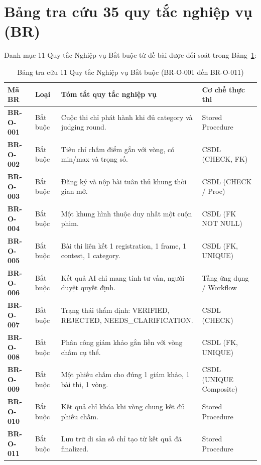 \section{Bảng tra cứu 35 quy tắc nghiệp vụ (BR)}
\label{a:br_catalog}

Danh mục 11 Quy tắc Nghiệp vụ Bắt buộc từ đề bài được đối soát trong Bảng~\ref{tab:a_br_mandatory}:

\begin{table}[!ht]
\centering
\caption{Bảng tra cứu 11 Quy tắc Nghiệp vụ Bắt buộc (BR-O-001 đến BR-O-011)}
\label{tab:a_br_mandatory}
\scriptsize
\begin{tabularx}{\textwidth}{p{1.8cm}p{1.6cm}>{\raggedright\arraybackslash}Xp{3.4cm}}
\toprule
\textbf{Mã BR} & \textbf{Loại} & \textbf{Tóm tắt quy tắc nghiệp vụ} & \textbf{Cơ chế thực thi} \\
\midrule
\textbf{BR-O-001} & Bắt buộc & Cuộc thi chỉ phát hành khi đủ category và judging round. & Stored Procedure \\
\textbf{BR-O-002} & Bắt buộc & Tiêu chí chấm điểm gắn với vòng, có min/max và trọng số. & CSDL (CHECK, FK) \\
\textbf{BR-O-003} & Bắt buộc & Đăng ký và nộp bài tuân thủ khung thời gian mở. & CSDL (CHECK / Proc) \\
\textbf{BR-O-004} & Bắt buộc & Một khung hình thuộc duy nhất một cuộn phim. & CSDL (FK NOT NULL) \\
\textbf{BR-O-005} & Bắt buộc & Bài thi liên kết 1 registration, 1 frame, 1 contest, 1 category. & CSDL (FK, UNIQUE) \\
\textbf{BR-O-006} & Bắt buộc & Kết quả AI chỉ mang tính tư vấn, người duyệt quyết định. & Tầng ứng dụng / Workflow \\
\textbf{BR-O-007} & Bắt buộc & Trạng thái thẩm định: VERIFIED, REJECTED, NEEDS\_CLARIFICATION. & CSDL (CHECK) \\
\textbf{BR-O-008} & Bắt buộc & Phân công giám khảo gắn liền với vòng chấm cụ thể. & CSDL (FK, UNIQUE) \\
\textbf{BR-O-009} & Bắt buộc & Một phiếu chấm cho đúng 1 giám khảo, 1 bài thi, 1 vòng. & CSDL (UNIQUE Composite) \\
\textbf{BR-O-010} & Bắt buộc & Kết quả chỉ khóa khi vòng chung kết đủ phiếu chấm. & Stored Procedure \\
\textbf{BR-O-011} & Bắt buộc & Lưu trữ di sản số chỉ tạo từ kết quả đã finalized. & Stored Procedure \\
\bottomrule
\end{tabularx}
\end{table}

